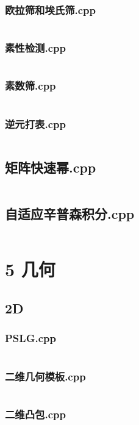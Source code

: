 \documentclass{article}
\begin{document}
\subsubsection{欧拉筛和埃氏筛.cpp}
\inputminted{c++}{/home/zzuzxy/t2/Template1.0/4 数学/数论/欧拉筛和埃氏筛.cpp}
\subsubsection{素性检测.cpp}
\inputminted{c++}{/home/zzuzxy/t2/Template1.0/4 数学/数论/素性检测.cpp}
\subsubsection{素数筛.cpp}
\inputminted{c++}{/home/zzuzxy/t2/Template1.0/4 数学/数论/素数筛.cpp}
\subsubsection{逆元打表.cpp}
\inputminted{c++}{/home/zzuzxy/t2/Template1.0/4 数学/数论/逆元打表.cpp}
\subsection{矩阵快速幂.cpp}
\inputminted{c++}{/home/zzuzxy/t2/Template1.0/4 数学/矩阵快速幂.cpp}
\subsection{自适应辛普森积分.cpp}
\inputminted{c++}{/home/zzuzxy/t2/Template1.0/4 数学/自适应辛普森积分.cpp}
\section{5 几何}
\subsection{2D}
\subsubsection{PSLG.cpp}
\inputminted{c++}{/home/zzuzxy/t2/Template1.0/5 几何/2D/PSLG.cpp}
\subsubsection{二维几何模板.cpp}
\inputminted{c++}{/home/zzuzxy/t2/Template1.0/5 几何/2D/二维几何模板.cpp}
\subsubsection{二维凸包.cpp}
\inputminted{c++}{/home/zzuzxy/t2/Template1.0/5 几何/2D/二维凸包.cpp}
\end{document}
